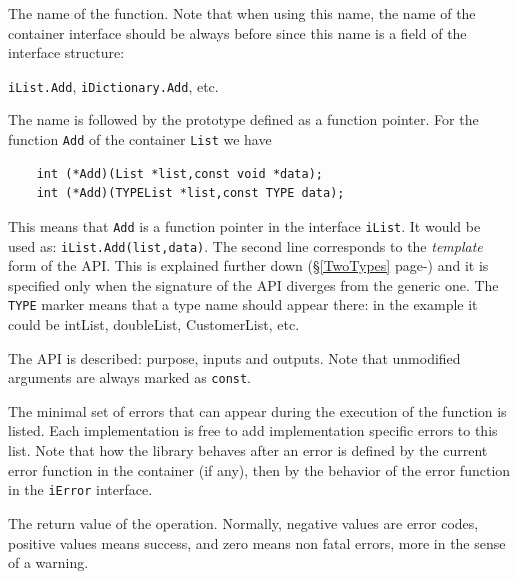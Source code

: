 \noindent The name of the function. Note that when using this name, the name of the container interface should be always before 
since this name is a field of the interface structure:

\noindent \verb,iList.Add,, \verb,iDictionary.Add,, etc.

\noindent The name is followed by the prototype defined as a function pointer. For the function \verb,Add, of the container \verb,List, we have
\begin{verbatim}
    int (*Add)(List *list,const void *data);
    int (*Add)(TYPEList *list,const TYPE data);
\end{verbatim} 
This means that \verb,Add, is a function pointer in the interface \verb,iList,. It would be used as:
\texttt{iList.Add(list,data)}.
The second line corresponds to the \textsl{template} form of the API. This is explained further down (\S \ref{TwoTypes} page-\pageref{TwoTypes}) and
it is specified only when the signature of the API diverges from the generic one. The \verb,TYPE, marker means that
a type name should appear there: in the example it could be intList, doubleList, CustomerList, etc.

\apidescription The API is described: purpose, inputs and outputs. Note that unmodified arguments are always marked
as \verb,const,.

\apierrors
The minimal set of errors that can appear during the execution of the function is listed. Each implementation 
is free to add implementation specific errors to this list. Note that how the library behaves after an error is 
defined by the current error function in the container (if any), then by the behavior of the error function in the 
\verb,iError, interface.

\returns
The return value of the operation. Normally, negative values are error codes, positive values means success, and zero means non fatal errors, more in the sense of a warning.

